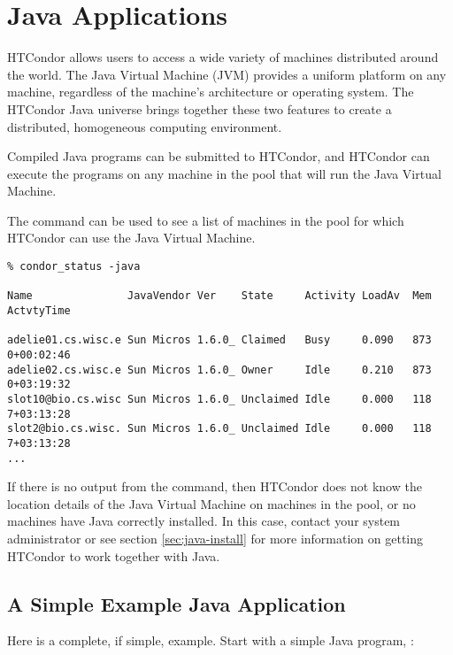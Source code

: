 
\section{Java Applications}\label{sec:Java}

HTCondor allows users to access a wide variety of
machines distributed around the world.
The Java Virtual Machine (JVM)
provides a uniform platform on any machine, regardless of the
machine's architecture or operating system.
The HTCondor Java universe brings together these
two features to create a distributed, homogeneous computing environment.

Compiled Java programs can be submitted to HTCondor, and HTCondor
can execute the programs on any machine in the pool that will run
the Java Virtual Machine.


The  command can be used to see a list of
machines in the pool for which HTCondor can use the Java Virtual
Machine.

\footnotesize
\begin{verbatim}
% condor_status -java

Name               JavaVendor Ver    State     Activity LoadAv  Mem  ActvtyTime

adelie01.cs.wisc.e Sun Micros 1.6.0_ Claimed   Busy     0.090   873  0+00:02:46
adelie02.cs.wisc.e Sun Micros 1.6.0_ Owner     Idle     0.210   873  0+03:19:32
slot10@bio.cs.wisc Sun Micros 1.6.0_ Unclaimed Idle     0.000   118  7+03:13:28
slot2@bio.cs.wisc. Sun Micros 1.6.0_ Unclaimed Idle     0.000   118  7+03:13:28
...
\end{verbatim}
\normalsize

If there is no output from the
 command,
then HTCondor does not know the location details of the Java Virtual
Machine on machines in the pool,
or no machines have Java correctly installed.
In this case,
contact your system administrator or see section \ref{sec:java-install}
for more information on getting HTCondor to work together
with Java.

\subsection{A Simple Example Java Application}

Here is a complete, if simple, example.
Start with a simple Java program, :

